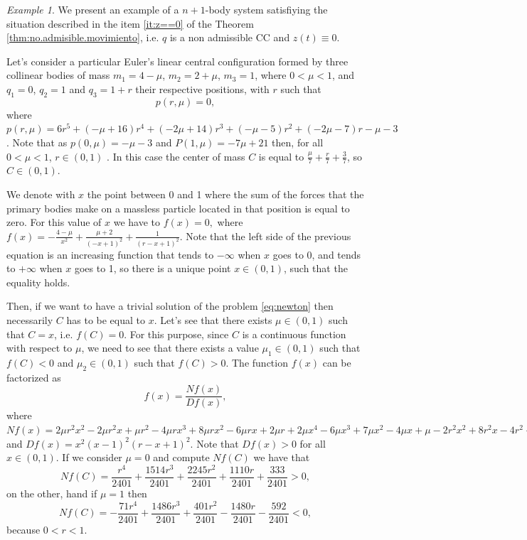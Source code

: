 \documentclass[twoside]{article}
\theoremstyle{remark}
\newtheorem{ejemplo}{Example}
\newcounter{example}
\begin{document}
\begin{ejemplo}
 We present an example of a $n+1$-body system satisfiying the situation described in the item \ref{it:z==0} of the Theorem \ref{thm:no.admisible.movimiento}, i.e. $q$ is a non admissible CC and $z(t)\equiv 0$.

 Let's  consider a particular Euler's linear central configuration formed by three collinear bodies of mass $m_1 = 4-\mu$, $m_2 = 2 + \mu$, $m_3 = 1$, where $0<\mu<1$, and $q_1 = 0$, $q_2 = 1$ and $q_3 = 1 + r$ their respective positions, with $r$ such that
\[ p(r,\mu)=0,\]
where $p(r,\mu)=6 r^{5} +\left(- \mu + 16\right) r^{4}  +  \left(- 2 \mu + 14\right) r^{3}+ \left(- \mu - 5\right)  r^{2}+\left(- 2 \mu - 7\right) r - \mu - 3$. Note that as $p(0,\mu)=-\mu-3$ and $P(1,\mu)=-7\mu+21$ then, for all $0<\mu<1$, $r\in (0,1)$ .
In this case the center of mass $C$ is equal to $\frac{\mu}{7} + \frac{r}{7} + \frac{3}{7}$, so $C\in (0,1)$.

We denote with $x$ the point between 0 and 1 where the sum of the forces that the primary bodies make on a massless particle located in that position is equal to zero. For this value of $x$ we have to
$f(x)=0,$ where $f(x)= - \frac{4-\mu }{x^{2}}+\frac{\mu + 2}{\left(- x + 1\right)^{2}} + \frac{1}{\left(r - x + 1\right)^{2}}$.
Note that the left side of the previous equation is an increasing function that tends to $-\infty$ when $x$ goes to 0, and tends to $+\infty$ when $x$ goes to 1, so there is a unique point $x\in (0,1)$, such that the equality holds.

Then, if we want to have a trivial solution of the problem \eqref{eq:newton} then necessarily $C$ has to be equal to $x$. Let's see that there exists $ \mu \in (0,1) $ such that $ C = x $, i.e. $f(C)=0$. For this purpose, since $C$ is a continuous function with respect to $\mu$,  we need to see that there exists a value $\mu_1\in (0,1)$ such that $f (C) <0$  and   $ \mu_2\in (0,1) $ such that $ f (C)> 0 $.  The function $f(x)$ can be factorized as $$f(x)=\frac{Nf(x)}{Df(x)},$$ where $Nf(x)=2 \mu r^{2} x^{2} - 2 \mu r^{2} x + \mu r^{2} - 4 \mu r x^{3} + 8 \mu r x^{2} - 6 \mu r x + 2 \mu r + 2 \mu x^{4} - 6 \mu x^{3} + 7 \mu x^{2} - 4 \mu x + \mu - 2 r^{2} x^{2} + 8 r^{2} x - 4 r^{2} + 4 r x^{3} - 20 r x^{2} + 24 r x - 8 r - x^{4} + 10 x^{3} - 21 x^{2} + 16 x - 4$ and $Df(x)=x^{2} \left(x - 1\right)^{2} \left(r - x + 1\right)^{2}$. Note that  $Df(x)>0$ for all $x\in (0,1)$. If we consider $\mu=0$ and compute $Nf(C)$ we have that
\[Nf(C)=\frac{r^{4}}{2401} + \frac{1514 r^{3}}{2401} + \frac{2245 r^{2}}{2401} + \frac{1110 r}{2401} + \frac{333}{2401}>0,\]
on the other, hand if  $\mu=1$ then
\[Nf(C)=- \frac{71 r^{4}}{2401} + \frac{1486 r^{3}}{2401} + \frac{401 r^{2}}{2401} - \frac{1480 r}{2401} - \frac{592}{2401}<0,\]
because $0<r<1$.
\end{ejemplo}
\end{document}
